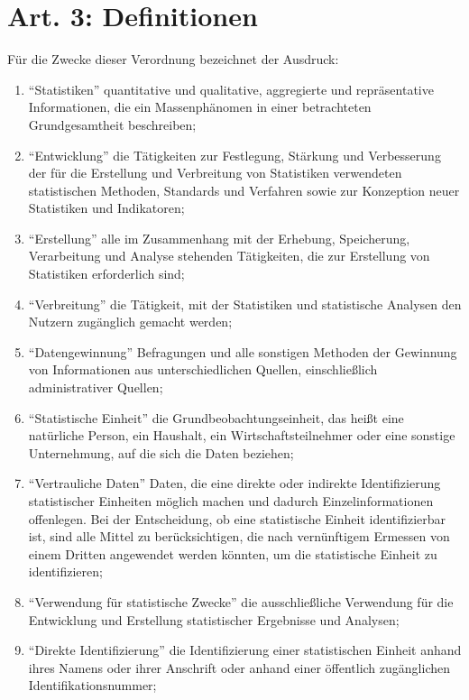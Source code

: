    \section{Art. 3: Definitionen}
        Für die Zwecke dieser Verordnung bezeichnet der Ausdruck:
        \begin{enumerate}
            \item ``Statistiken'' quantitative und qualitative, aggregierte und repräsentative Informationen, die ein Massenphänomen in einer betrachteten Grundgesamtheit beschreiben;
            \item ``Entwicklung'' die Tätigkeiten zur Festlegung, Stärkung und Verbesserung der für die Erstellung und Verbreitung von Statistiken verwendeten statistischen Methoden, Standards und Verfahren sowie zur Konzeption neuer Statistiken und Indikatoren;
            \item ``Erstellung'' alle im Zusammenhang mit der Erhebung, Speicherung, Verarbeitung und Analyse stehenden Tätigkeiten, die zur Erstellung von Statistiken erforderlich sind;
            \item ``Verbreitung'' die Tätigkeit, mit der Statistiken und statistische Analysen den Nutzern zugänglich gemacht werden;
            \item ``Datengewinnung'' Befragungen und alle sonstigen Methoden der Gewinnung von Informationen aus unterschiedlichen Quellen, einschließlich administrativer Quellen;
            \item ``Statistische Einheit'' die Grundbeobachtungseinheit, das heißt eine natürliche Person, ein Haushalt, ein Wirtschaftsteilnehmer oder eine sonstige Unternehmung, auf die sich die Daten beziehen;
            \item ``Vertrauliche Daten'' Daten, die eine direkte oder indirekte Identifizierung statistischer Einheiten möglich machen und dadurch Einzelinformationen offenlegen. Bei der Entscheidung, ob eine statistische Einheit identifizierbar ist, sind alle Mittel zu berücksichtigen, die nach vernünftigem Ermessen von einem Dritten angewendet werden könnten, um die statistische Einheit zu identifizieren;
            \item ``Verwendung für statistische Zwecke'' die ausschließliche Verwendung für die Entwicklung und Erstellung statistischer Ergebnisse und Analysen;
            \item ``Direkte Identifizierung'' die Identifizierung einer statistischen Einheit anhand ihres Namens oder ihrer Anschrift oder anhand einer öffentlich zugänglichen Identifikationsnummer;

\end{enumerate}
